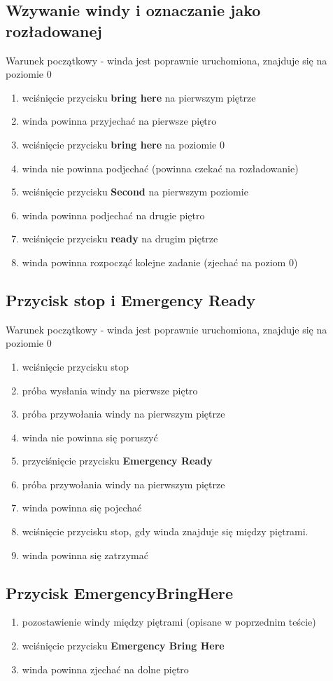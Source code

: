 \documentclass[a4paper,11pt]{article}
\begin{document}
\subsection{Wzywanie windy i oznaczanie jako rozładowanej} 
Warunek początkowy - winda jest poprawnie uruchomiona, znajduje się na poziomie 0
\begin{enumerate}
\item wciśnięcie przycisku \textbf{bring here} na pierwszym piętrze
\item winda powinna przyjechać na pierwsze piętro
\item wciśnięcie przycisku \textbf{bring here} na poziomie 0
\item winda nie powinna podjechać (powinna czekać na rozładowanie)
\item wciśnięcie przycisku \textbf{Second} na pierwszym poziomie
\item winda powinna podjechać na drugie piętro
\item wciśnięcie przycisku \textbf{ready} na drugim piętrze
\item winda powinna rozpocząć kolejne zadanie (zjechać na poziom 0)
\end{enumerate}
\subsection{Przycisk stop i Emergency Ready}
Warunek początkowy - winda jest poprawnie uruchomiona, znajduje się na poziomie 0
\begin{enumerate}
\item wciśnięcie przycisku stop
\item próba wysłania windy na pierwsze piętro
\item próba przywołania windy na pierwszym piętrze 
\item winda nie powinna się poruszyć
\item przyciśnięcie przycisku \textbf{Emergency Ready}
\item próba przywołania windy na pierwszym piętrze 
\item winda powinna się pojechać
\item wciśnięcie przycisku stop, gdy winda znajduje się między piętrami.
\item winda powinna się zatrzymać
\end{enumerate} 
\subsection{Przycisk EmergencyBringHere}
\begin{enumerate}
\item pozostawienie windy między piętrami (opisane w poprzednim teście)
\item wciśnięcie przycisku \textbf{Emergency Bring Here}
\item winda powinna zjechać na dolne piętro
\end{enumerate}
\end{document}
